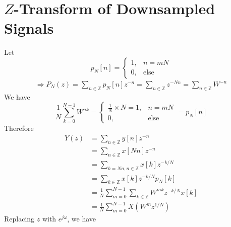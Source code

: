 \section{$Z$-Transform of Downsampled Signals}\label{sec:p6}

Let
\[p_N[n] = \begin{cases}
1, & n = mN\\ 0, & \text{else}
\end{cases}\]
\begin{align*}
	\Rightarrow P_N(z)
	= \sum_{n \in \mathbb{Z}} p_N[n] z^{-n} 
	= \sum_{n \in \mathbb{Z}} z^{-Nn} 
	= \sum_{n \in \mathbb{Z}} W^{-n}
\end{align*}
We have
\[\frac{1}{N} \sum_{k=0}^{N-1} W^{nk} = \begin{cases}
\frac{1}{N} \times N = 1, & n = mN\\
0, & \text{else}
\end{cases} = p_N[n]\]
Therefore
\begin{align*}
	Y(z)
	&= \sum_{n \in \mathbb{Z}} y[n] z^{-n} \\
	&= \sum_{n \in \mathbb{Z}} x[Nn] z^{-n} \\
	&= \sum_{k = Nn, n \in \mathbb{Z}} x[k] z^{-k/N} \\
	&= \sum_{k \in \mathbb{Z}} x[k] z^{-k/N} p_N[k] \\
	&= \frac{1}{N} \sum_{m=0}^{N-1} \sum_{k \in \mathbb{Z}} W^{mk} z^{-k/N} x[k] \\
	&= \frac{1}{N} \sum_{m=0}^{N-1}X(W^m z^{1/N})
\end{align*}
Replacing $z$ with $e^{j\omega}$, we have

